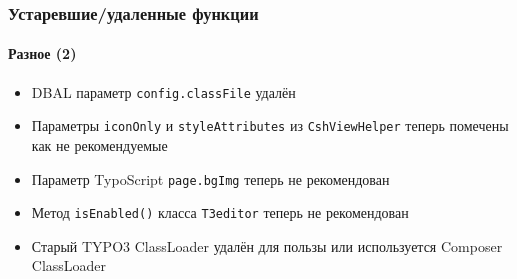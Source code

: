 \begin{frame}[fragile]
	\frametitle{Устаревшие/удаленные функции}
	\framesubtitle{Разное (2)}

	\begin{itemize}

		\item DBAL параметр \texttt{config.classFile} удалён

		\item Параметры \texttt{iconOnly} и \texttt{styleAttributes} из
			\texttt{CshViewHelper} теперь помечены как не рекомендуемые

		\item Параметр TypoScript \texttt{page.bgImg} теперь не рекомендован

		\item Метод \texttt{isEnabled()} класса \texttt{T3editor} теперь не рекомендован

		\item Старый TYPO3 ClassLoader удалён для пользы или используется Composer ClassLoader

	\end{itemize}

\end{frame}

